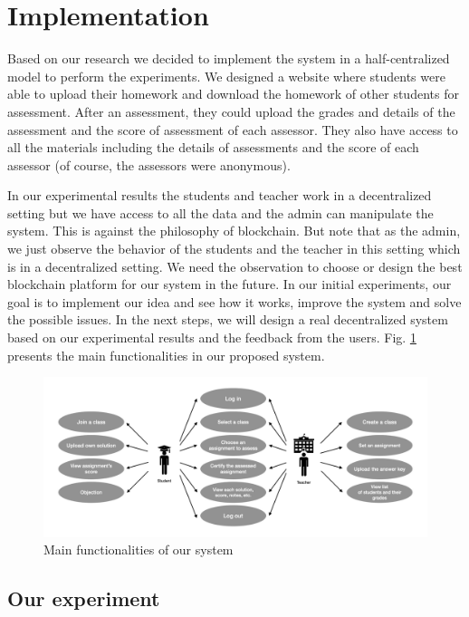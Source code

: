 \documentclass[manuscript,review,anonymous]{acmart}%
\begin{document}
\section{Implementation}

Based on our research we decided to implement the system in a half-centralized model to perform the experiments. 
We designed a website where students were able to upload their homework and download the homework of other students for assessment. After an assessment, they could upload the grades and details of the assessment and the score of assessment of each assessor. They also have access to all the materials including the details of assessments and the score of each assessor (of course, the assessors were anonymous).

In our experimental results
the students and teacher work in a decentralized setting but we have access to all the data and the admin can manipulate the system. This is against the philosophy of blockchain. But note that as the admin, we just observe the behavior of the students and the teacher in this setting which is in a decentralized setting.
We need the observation to choose or design the best blockchain platform for our system in the future. In our initial experiments, our goal is to implement our idea and see how it works, improve the system and solve the possible issues. In the next steps, we will design a real decentralized system based on our experimental results and the feedback from the users. 
Fig. \ref{fig2} presents the main functionalities in our proposed system.
\begin{figure}[H]
 \caption{Main functionalities of our system}
 
\includegraphics[scale=0.15]{fig2.jpeg}


\label{fig2}
\end{figure}

\subsection{Our experiment}
\end{document}
